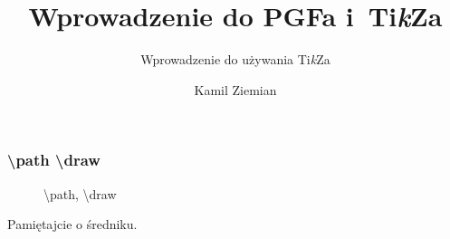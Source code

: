 \documentclass[10pt,t]{beamer}
\title{Wprowadzenie do PGFa i~Ti\textit{k}Za}
\subtitle{Wprowadzenie do używania Ti\textit{k}Za}
\author{Kamil Ziemian}
\date{}
\begin{document}






\RaggedRight





\maketitle










\begin{frame}
  \frametitle{\textbackslash path \textbackslash draw}


  \begin{figure}

    \centering

    \begin{tikzpicture}



    \end{tikzpicture}


    \caption{\textbackslash path, \textbackslash draw}

  \end{figure}


  Pamiętajcie o średniku.

\end{frame}
\end{document}
